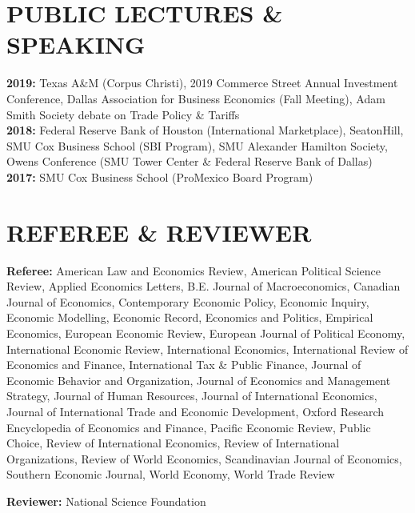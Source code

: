\documentclass[11pt]{res}
\begin{document}
\begin{resume}
\section{PUBLIC LECTURES \& SPEAKING}\vspace{1.5mm}
{\bf 2019:} Texas A\&M (Corpus Christi), 2019 Commerce Street Annual Investment Conference, Dallas Association for Business Economics (Fall Meeting), Adam Smith Society debate on Trade Policy \& Tariffs\vspace{1.5mm}\\
{\bf 2018:} Federal Reserve Bank of Houston (International Marketplace), SeatonHill, SMU Cox Business School (SBI Program), SMU Alexander Hamilton Society, Owens Conference (SMU Tower Center \& Federal Reserve Bank of Dallas)\vspace{1.5mm}\\
{\bf 2017:} SMU Cox Business School (ProMexico Board Program)

\section{REFEREE \& REVIEWER} \vspace{1.5mm}
{\bf Referee:} American Law and Economics Review, American Political Science Review, Applied Economics Letters, B.E. Journal of Macroeconomics, Canadian Journal of Economics, Contemporary Economic Policy, Economic Inquiry, Economic Modelling, Economic Record, Economics and Politics, Empirical Economics, European Economic Review, European Journal of Political Economy, International Economic Review, International Economics, International Review of Economics and Finance, International Tax \& Public Finance, Journal of Economic Behavior and Organization, Journal of Economics and Management Strategy, Journal of Human Resources, Journal of International Economics, Journal of International Trade and Economic Development, Oxford Research Encyclopedia of Economics and Finance, Pacific Economic Review, Public Choice, Review of International Economics, Review of International Organizations, Review of World Economics, Scandinavian Journal of Economics, Southern Economic Journal, World Economy, World Trade Review

{\bf Reviewer:} National Science Foundation


\end{resume}
\end{document}
